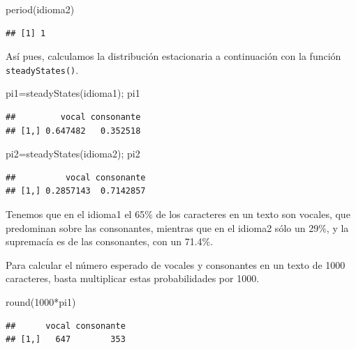 \documentclass[
]{book}
\newenvironment{Shaded}{\begin{snugshade}}{\end{snugshade}}
\newcommand{\DecValTok}[1]{\textcolor[rgb]{0.00,0.00,0.81}{#1}}
\newcommand{\FunctionTok}[1]{\textcolor[rgb]{0.00,0.00,0.00}{#1}}
\newcommand{\NormalTok}[1]{#1}
\newcommand{\OtherTok}[1]{\textcolor[rgb]{0.56,0.35,0.01}{#1}}
\newcommand{\SpecialCharTok}[1]{\textcolor[rgb]{0.00,0.00,0.00}{#1}}
\theoremstyle{definition}
\theoremstyle{definition}
\theoremstyle{definition}
\theoremstyle{definition}
\theoremstyle{remark}
\begin{document}
\begin{Shaded}
\begin{Highlighting}[]
\FunctionTok{period}\NormalTok{(idioma2)}
\end{Highlighting}
\end{Shaded}

\begin{verbatim}
## [1] 1
\end{verbatim}

Así pues, calculamos la distribución estacionaria a continuación con la función \texttt{steadyStates()}.

\begin{Shaded}
\begin{Highlighting}[]
\NormalTok{pi1}\OtherTok{=}\FunctionTok{steadyStates}\NormalTok{(idioma1); pi1}
\end{Highlighting}
\end{Shaded}

\begin{verbatim}
##         vocal consonante
## [1,] 0.647482   0.352518
\end{verbatim}

\begin{Shaded}
\begin{Highlighting}[]
\NormalTok{pi2}\OtherTok{=}\FunctionTok{steadyStates}\NormalTok{(idioma2); pi2}
\end{Highlighting}
\end{Shaded}

\begin{verbatim}
##          vocal consonante
## [1,] 0.2857143  0.7142857
\end{verbatim}

Tenemos que en el idioma1 el 65\% de los caracteres en un texto son vocales, que predominan sobre las consonantes, mientras que en el idioma2 sólo un 29\%, y la supremacía es de las consonantes, con un 71.4\%.

Para calcular el número esperado de vocales y consonantes en un texto de 1000 caracteres, basta multiplicar estas probabilidades por 1000.

\begin{Shaded}
\begin{Highlighting}[]
\FunctionTok{round}\NormalTok{(}\DecValTok{1000}\SpecialCharTok{*}\NormalTok{pi1)}
\end{Highlighting}
\end{Shaded}

\begin{verbatim}
##      vocal consonante
## [1,]   647        353
\end{verbatim}
\end{document}
